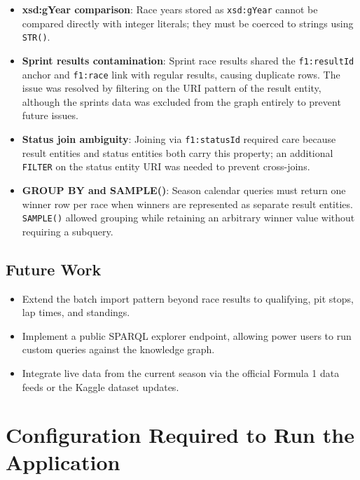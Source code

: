\documentclass[12pt,a4paper]{article}
\begin{document}
\begin{itemize}[leftmargin=1.5em]
  \item \textbf{xsd:gYear comparison}: Race years stored as \texttt{xsd:gYear}
        cannot be compared directly with integer literals; they must be
        coerced to strings using \texttt{STR()}.

  \item \textbf{Sprint results contamination}: Sprint race results shared the
        \texttt{f1:resultId} anchor and \texttt{f1:race} link with regular
        results, causing duplicate rows. The issue was resolved by filtering
        on the URI pattern of the result entity, although the sprints data was 
        excluded from the graph entirely to prevent future issues.

  \item \textbf{Status join ambiguity}: Joining via \texttt{f1:statusId}
        required care because result entities and status entities both carry this
        property; an additional \texttt{FILTER} on the status entity URI was
        needed to prevent cross-joins.

  \item \textbf{GROUP BY and SAMPLE()}: Season calendar queries must return one
        winner row per race when winners are represented as separate result
        entities. \texttt{SAMPLE()} allowed grouping while retaining an
        arbitrary winner value without requiring a subquery.
\end{itemize}

\subsection{Future Work}

\begin{itemize}[leftmargin=1.5em]
  \item Extend the batch import pattern beyond race results to qualifying,
        pit stops, lap times, and standings.
  \item Implement a public SPARQL explorer endpoint, allowing power users to
        run custom queries against the knowledge graph.
  \item Integrate live data from the current season via the official Formula 1 data feeds or the Kaggle dataset updates.
\end{itemize}

\section{Configuration Required to Run the Application}
\end{document}
